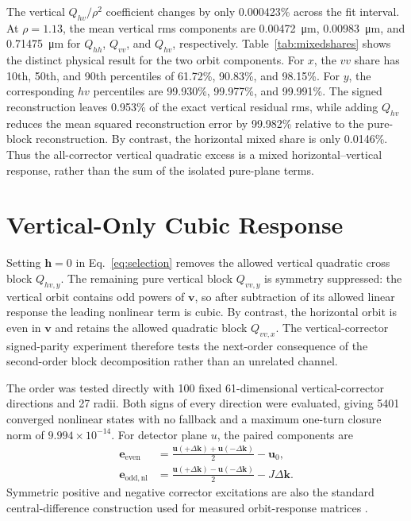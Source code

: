 \documentclass[letterpaper]{jacow}
\begin{document}
The vertical $Q_{hv}/\rho^2$ coefficient changes by only 0.000423\% across the
fit interval.  At $\rho=1.13$, the mean vertical rms components are
\qty{0.00472}{\micro\metre}, \qty{0.00983}{\micro\metre}, and
\qty{0.71475}{\micro\metre} for $Q_{hh}$, $Q_{vv}$, and $Q_{hv}$,
respectively.  Table~\ref{tab:mixedshares} shows the distinct physical result
for the two orbit components.  For $x$, the $vv$ share has 10th, 50th, and 90th
percentiles of 61.72\%, 90.83\%, and 98.15\%.  For $y$, the corresponding
$hv$ percentiles are 99.930\%, 99.977\%, and 99.991\%.  The signed
reconstruction leaves 0.953\% of the exact vertical residual rms, while adding
$Q_{hv}$ reduces the mean squared reconstruction error by 99.982\% relative to
the pure-block reconstruction.  By contrast, the horizontal mixed share is
only 0.0146\%.  Thus the all-corrector vertical quadratic excess is a mixed
horizontal--vertical response, rather than the sum of the isolated pure-plane
terms.



\section{Vertical-Only Cubic Response}

Setting $\bm h=0$ in Eq.~\eqref{eq:selection} removes the allowed vertical
quadratic cross block $Q_{hv,y}$.  The remaining pure vertical block
$Q_{vv,y}$ is symmetry suppressed: the vertical orbit contains odd powers of
$\bm v$, so after subtraction of its allowed linear response the leading
nonlinear term is cubic.  By contrast, the horizontal orbit is even in
$\bm v$ and retains the allowed quadratic block $Q_{vv,x}$.  The
vertical-corrector signed-parity experiment therefore tests the next-order
consequence of the second-order block decomposition rather than an unrelated
channel.

The order was tested directly with 100 fixed 61-dimensional vertical-corrector
directions and 27 radii.  Both signs of every direction were evaluated, giving
5401 converged nonlinear states with no fallback and a maximum one-turn closure
norm of $9.994\times10^{-14}$.  For detector plane $u$, the paired components
are
\begin{align}
  \bm e_{\mathrm{even}} &=
    \frac{\bm u(+\Delta\bm k)+\bm u(-\Delta\bm k)}{2}-\bm u_0, \\
  \bm e_{\mathrm{odd,nl}} &=
    \frac{\bm u(+\Delta\bm k)-\bm u(-\Delta\bm k)}{2}
    -J\Delta\bm k .
  \label{eq:parity}
\end{align}
Symmetric positive and negative corrector excitations are also the standard
central-difference construction used for measured orbit-response matrices
\cite{thiry2016}.
\end{document}
